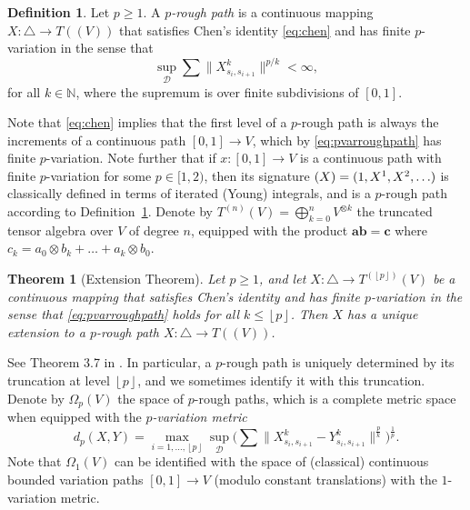 \documentclass[11pt, letterpaper]{article}
\let\sig\relax
\DeclareMathOperator{\sig}{S}
\newtheorem{theorem}{Theorem}
\theoremstyle{definition}
\newtheorem{definition}{Definition}
\theoremstyle{remark}
\newcommand{\N}{\mathbb{N}}
\begin{document}
\begin{appendices}
\begin{definition}\label{def:proughpath}
    Let $p \ge 1$. A \emph{$p$-rough path} is a continuous mapping $X\colon \triangle \to T((V))$ that satisfies Chen's identity \eqref{eq:chen} and has finite $p$-variation in the sense that 
    \begin{equation}\label{eq:pvarroughpath}
        \sup_{\mathcal{D}} \sum \|X^{k}_{s_i,s_{i+1}}\|^{p / k} < \infty,
    \end{equation} 
    for all $k\in \N$, where the supremum is over finite subdivisions of $[0,1]$.
\end{definition}
Note that \eqref{eq:chen} implies that the first level of a $p$-rough path is always the increments of a continuous path $[0,1] \to V$, which by \eqref{eq:pvarroughpath} has finite $p$-variation. Note further that if $x\colon [0,1]\to V$ is a continuous path with finite $p$-variation for some $p\in [1,2)$, then its signature $\sig(X) = (1,X^1,X^2,\ldots)$ is classically defined in terms of iterated (Young) integrals, and is a $p$-rough path according to Definition~\ref{def:proughpath}. Denote by $T^{(n)}(V) = \bigoplus_{k=0}^n V^{\otimes k}$ the truncated tensor algebra over $V$ of degree $n$, equipped with the product $\boldsymbol a \boldsymbol b = \boldsymbol c$ where $c_k = a_0 \otimes b_k +\ldots + a_k \otimes b_0$.

\begin{theorem}[Extension Theorem]\label{thm:extension}
    Let $p \ge 1 $, and let $X\colon \triangle \to T^{(\left\lfloor p \right\rfloor )}(V)$ be a continuous mapping that satisfies Chen's identity and has finite $p$-variation in the sense that \eqref{eq:pvarroughpath} holds for all $k \le \left\lfloor p \right\rfloor $. Then $X$ has a unique extension to a $p$-rough path $X\colon \triangle \to T((V))$.
\end{theorem}
See Theorem 3.7 in \cite{terrystflour}.
In particular, a $p$-rough path is uniquely determined by its truncation at level $\left\lfloor p \right\rfloor $, and we sometimes identify it with this truncation. Denote by $\Omega_p(V)$ the space of $p$-rough paths, which is a complete metric space when equipped with the \emph{$p$-variation metric} \cite[Sect.\ 3.3.1]{lyonsqian} \[
    d_p(X,Y) = \max_{i=1, \ldots ,\left\lfloor p \right\rfloor } \sup_{\mathcal{D}} \bigg( \sum \| X^{k}_{s_i,s_{i+1}} - Y^k_{s_i,s_{i+1}}\|^{\frac{p}{k}} \bigg)^{\frac{1}{p}}.
\] Note that $\Omega_1(V)$ can be identified with the space of (classical) continuous bounded variation paths $[0,1]\to V$ (modulo constant translations) with the $1$-variation metric.


\end{appendices}
\end{document}

